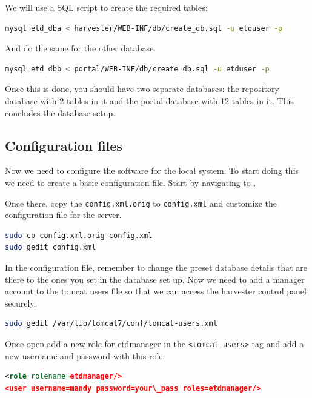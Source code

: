 \documentclass[a4paper,11pt]{article}
\begin{document}
We will use a SQL script to create the required tables: 

\begin{lstlisting}[language=bash]
mysql etd_dba < harvester/WEB-INF/db/create_db.sql -u etduser -p
\end{lstlisting}

And do the same for the other database. 

\begin{lstlisting}[language=bash]
mysql etd_dbb < portal/WEB-INF/db/create_db.sql -u etduser -p
\end{lstlisting}

Once this is done, you should have two separate databases: the repository database with 2 tables in it and the portal database with 12 tables in it. This concludes the database setup.

\subsection{Configuration files}
\label{sec:installation_process:configuration_files}

Now we need to configure the software for the local system. To start doing this we need to create a basic configuration file. Start by navigating to .

Once there, copy the \texttt{config.xml.orig} to \texttt{config.xml} and customize the configuration file for the server. 

\begin{lstlisting}[language=bash]
sudo cp config.xml.orig config.xml 
sudo gedit config.xml
\end{lstlisting}

In the configuration file, remember to change the preset database details that are there to the ones you set in the database set up. Now we need to add a manager account to the tomcat users file so that we can access the harvester control panel securely. 

\begin{lstlisting}[language=bash]
sudo gedit /var/lib/tomcat7/conf/tomcat-users.xml
\end{lstlisting}

Once open add a new role for etdmanager in the \texttt{<tomcat-users>} tag and add a new username and password with this role. 

\begin{lstlisting}[language=XML]
<role rolename=etdmanager/> 
<user username=mandy password=your\_pass roles=etdmanager/>
\end{lstlisting}
\end{document}
